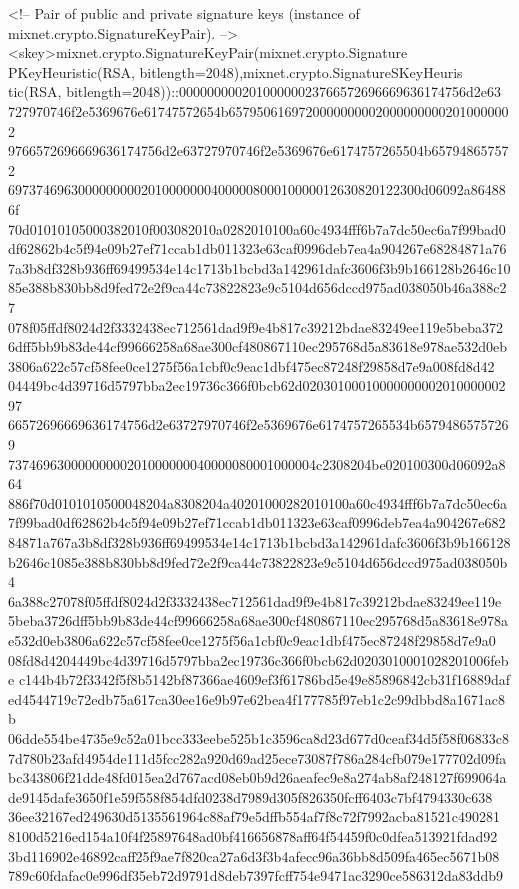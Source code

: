    <!-- Pair of public and private signature keys (instance of 
        mixnet.crypto.SignatureKeyPair). -->
   <skey>mixnet.crypto.SignatureKeyPair(mixnet.crypto.Signature
PKeyHeuristic(RSA, bitlength=2048),mixnet.crypto.SignatureSKeyHeuris
tic(RSA, bitlength=2048))::00000000020100000023766572696669636174756d2e63
727970746f2e5369676e61747572654b65795061697200000000020000000002010000002
9766572696669636174756d2e63727970746f2e5369676e6174757265504b657948657572
69737469630000000002010000000400000800010000012630820122300d06092a864886f
70d01010105000382010f003082010a0282010100a60c4934fff6b7a7dc50ec6a7f99bad0
df62862b4c5f94e09b27ef71ccab1db011323e63caf0996deb7ea4a904267e68284871a76
7a3b8df328b936ff69499534e14c1713b1bcbd3a142961dafc3606f3b9b166128b2646c10
85e388b830bb8d9fed72e2f9ca44c73822823e9c5104d656dccd975ad038050b46a388c27
078f05ffdf8024d2f3332438ec712561dad9f9e4b817c39212bdae83249ee119e5beba372
6dff5bb9b83de44cf99666258a68ae300cf480867110ec295768d5a83618e978ae532d0eb
3806a622c57cf58fee0ce1275f56a1cbf0c9eac1dbf475ec87248f29858d7e9a008fd8d42
04449bc4d39716d5797bba2ec19736c366f0bcb62d0203010001000000000201000000297
66572696669636174756d2e63727970746f2e5369676e6174757265534b65794865757269
73746963000000000201000000040000080001000004c2308204be020100300d06092a864
886f70d0101010500048204a8308204a40201000282010100a60c4934fff6b7a7dc50ec6a
7f99bad0df62862b4c5f94e09b27ef71ccab1db011323e63caf0996deb7ea4a904267e682
84871a767a3b8df328b936ff69499534e14c1713b1bcbd3a142961dafc3606f3b9b166128
b2646c1085e388b830bb8d9fed72e2f9ca44c73822823e9c5104d656dccd975ad038050b4
6a388c27078f05ffdf8024d2f3332438ec712561dad9f9e4b817c39212bdae83249ee119e
5beba3726dff5bb9b83de44cf99666258a68ae300cf480867110ec295768d5a83618e978a
e532d0eb3806a622c57cf58fee0ce1275f56a1cbf0c9eac1dbf475ec87248f29858d7e9a0
08fd8d4204449bc4d39716d5797bba2ec19736c366f0bcb62d0203010001028201006febe
c144b4b72f3342f5f8b5142bf87366ae4609ef3f61786bd5e49e85896842cb31f16889daf
ed4544719c72edb75a617ca30ee16e9b97e62bea4f177785f97eb1c2c99dbbd8a1671ac8b
06dde554be4735e9c52a01bcc333eebe525b1c3596ca8d23d677d0ceaf34d5f58f06833c8
7d780b23afd4954de111d5fcc282a920d69ad25ece73087f786a284cfb079e177702d09fa
bc343806f21dde48fd015ea2d767acd08eb0b9d26aeafec9e8a274ab8af248127f699064a
de9145dafe3650f1e59f558f854dfd0238d7989d305f826350fcff6403c7bf4794330c638
36ee32167ed249630d5135561964c88af79e5dffb554af7f8c72f7992acba81521c490281
8100d5216ed154a10f4f25897648ad0bf416656878aff64f54459f0c0dfea513921fdad92
3bd116902e46892caff25f9ae7f820ca27a6d3f3b4afecc96a36bb8d509fa465ec5671b08
789c60fdafac0e996df35eb72d9791d8deb7397fcff754e9471ac3290ce586312da83ddb9
